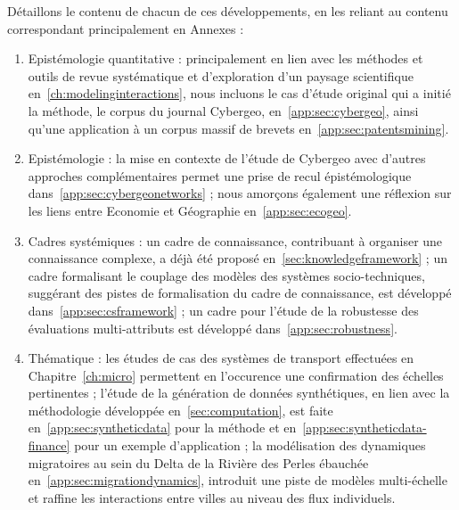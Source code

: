 Détaillons le contenu de chacun de ces développements, en les reliant au contenu correspondant principalement en Annexes :
\begin{enumerate}
	\item Epistémologie quantitative : principalement en lien avec les méthodes et outils de revue systématique et d'exploration d'un paysage scientifique en~\ref{ch:modelinginteractions}, nous incluons le cas d'étude original qui a initié la méthode, le corpus du journal Cybergeo, en~\ref{app:sec:cybergeo}, ainsi qu'une application à un corpus massif de brevets en~\ref{app:sec:patentsmining}.
	\item Epistémologie : la mise en contexte de l'étude de Cybergeo avec d'autres approches complémentaires permet une prise de recul épistémologique dans~\ref{app:sec:cybergeonetworks} ; nous amorçons également une réflexion sur les liens entre Economie et Géographie en~\ref{app:sec:ecogeo}.
	\item Cadres systémiques : un cadre de connaissance, contribuant à organiser une connaissance complexe, a déjà été proposé en~\ref{sec:knowledgeframework} ; un cadre formalisant le couplage des modèles des systèmes socio-techniques, suggérant des pistes de formalisation du cadre de connaissance, est développé dans~\ref{app:sec:csframework} ; un cadre pour l'étude de la robustesse des évaluations multi-attributs est développé dans~\ref{app:sec:robustness}.
	\item Thématique : les études de cas des systèmes de transport effectuées en Chapitre~\ref{ch:micro} permettent en l'occurence une confirmation des échelles pertinentes ; l'étude de la génération de données synthétiques,  en lien avec la méthodologie développée en~\ref{sec:computation}, est faite en~\ref{app:sec:syntheticdata} pour la méthode et en~\ref{app:sec:syntheticdata-finance} pour un exemple d'application ; la modélisation des dynamiques migratoires au sein du Delta de la Rivière des Perles ébauchée en~\ref{app:sec:migrationdynamics}, introduit une piste de modèles multi-échelle et raffine les interactions entre villes au niveau des flux individuels.
\end{enumerate}


